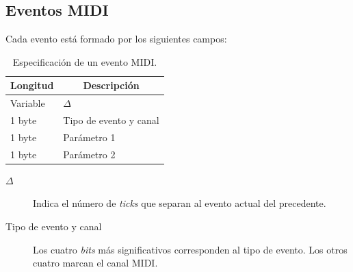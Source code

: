 \subsection{Eventos MIDI}

Cada evento está formado por los siguientes campos:

\smallskip

\begin{table}[H]
	\begin{center}
		\begin{tabular}{|l|l|}
			\hline \multicolumn{1}{|c|}{\textbf{Longitud}} & \multicolumn{1}{c|}{\textbf{Descripción}} \\
			\hline Variable & $\Delta$ \\ 
			\hline 1 byte & Tipo de evento y canal \\ 
			\hline 1 byte & Parámetro 1 \\ 
			\hline 1 byte & Parámetro 2 \\ 
			\hline 
		\end{tabular}
		\smallskip
		\caption{\label{tab:midi_evento} Especificación de un evento MIDI.}
	\end{center}
\end{table}

\smallskip

\begin{description}
	\item[$\Delta$] Indica el número de \textit{ticks} que separan al evento actual del precedente.
	\item[Tipo de evento y canal] Los cuatro \textit{bits} más significativos corresponden al tipo de evento. Los otros cuatro marcan el canal \acrshort{MIDI}.
\end{description}

\smallskip

